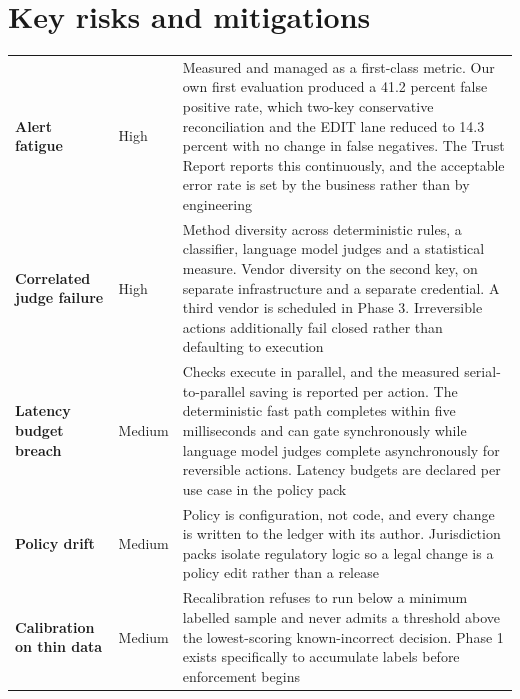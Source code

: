 \documentclass[10pt]{article}
\begin{document}
\section{Key risks and mitigations}

\vspace{2pt}
{\small
\begin{xltabular}{\textwidth}{@{}L{0.205\textwidth}L{0.085\textwidth}Y@{}}
\toprule
{} &  &  \\
\midrule
\textbf{Alert fatigue} & \textcolor{bad}{High} & Measured and managed as a first-class metric. Our own first evaluation produced a 41.2 percent false positive rate, which two-key conservative reconciliation and the EDIT lane reduced to 14.3 percent with no change in false negatives. The Trust Report reports this continuously, and the acceptable error rate is set by the business rather than by engineering \\
\textbf{Correlated judge failure} & \textcolor{bad}{High} & Method diversity across deterministic rules, a classifier, language model judges and a statistical measure. Vendor diversity on the second key, on separate infrastructure and a separate credential. A third vendor is scheduled in Phase 3. Irreversible actions additionally fail closed rather than defaulting to execution \\
\textbf{Latency budget breach} & \textcolor{warn}{Medium} & Checks execute in parallel, and the measured serial-to-parallel saving is reported per action. The deterministic fast path completes within five milliseconds and can gate synchronously while language model judges complete asynchronously for reversible actions. Latency budgets are declared per use case in the policy pack \\
\textbf{Policy drift} & \textcolor{warn}{Medium} & Policy is configuration, not code, and every change is written to the ledger with its author. Jurisdiction packs isolate regulatory logic so a legal change is a policy edit rather than a release \\
\textbf{Calibration on thin data} & \textcolor{warn}{Medium} & Recalibration refuses to run below a minimum labelled sample and never admits a threshold above the lowest-scoring known-incorrect decision. Phase 1 exists specifically to accumulate labels before enforcement begins \\

\end{xltabular}}
\end{document}
